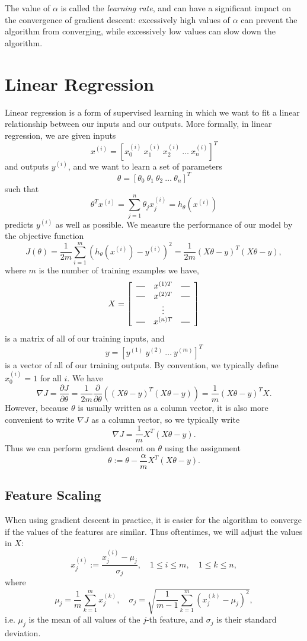 \documentclass{article}
\newcommand*{\horzbar}{\rule[.5ex]{2.5ex}{0.5pt}}
\begin{document}
The value of $\alpha$ is called the \emph{learning rate}, and can have a significant impact on the convergence of gradient descent: excessively high values of $\alpha$ can prevent the algorithm from converging, while excessively low values can slow down the algorithm.

\section{Linear Regression}\label{linreg}
Linear regression is a form of supervised learning in which we want to fit a linear relationship between our inputs and our outputs. More formally, in linear regression, we are given inputs 
$$x^{(i)} = \left[x_0^{(i)}\ x_1^{(i)}\ x_2^{(i)}\ \dots \ x_n^{(i)}\right]^T$$
and outputs $y^{(i)}$, and we want to learn a set of parameters
$$\theta = \left[\theta_0\ \theta_1\ \theta_2\ \dots \ \theta_n\right]^T$$
such that
$$\theta^T x^{(i)} = \sum_{j=1}^n \theta_j x_j^{(i)} = h_{\theta}\left(x^{(i)}\right)$$
predicts $y^{(i)}$ as well as possible. We measure the performance of our model by the objective function
$$J(\theta) = \frac{1}{2m}\sum_{i=1}^m \left(h_{\theta}\left(x^{(i)}\right) - y^{(i)}\right)^2 = \frac{1}{2m}(X\theta - y)^T(X\theta-y),$$
where $m$ is the number of training examples we have, 
$$X = \left[
\begin{array}{ccc}
\horzbar & x^{(1)T} & \horzbar \\
\horzbar & x^{(2)T} & \horzbar \\
& \vdots & \\
\horzbar & x^{(n)T} & \horzbar \\
\end{array}
\right]$$
is a matrix of all of our training inputs, and
$$y = \left[y^{(1)}\ y^{(2)}\ \dots \ y^{(m)}\right]^T$$
is a vector of all of our training outputs. By convention, we typically define $x_0^{(i)} = 1$ for all $i$. We have
$$\nabla J = \frac{\partial J}{\partial \theta} = \frac{1}{2m} \frac{\partial}{\partial \theta}\left((X\theta - y)^T(X\theta - y)\right) = \frac{1}{m}(X\theta - y)^T X.$$
However, because $\theta$ is usually written as a column vector, it is also more convenient to write $\nabla J$ as a column vector, so we typically write
$$\nabla J = \frac{1}{m} X^T(X\theta - y).$$
Thus we can perform gradient descent on $\theta$ using the assignment
$$\theta := \theta - \frac{\alpha}{m} X^T(X\theta - y).$$
\subsection{Feature Scaling}
When using gradient descent in practice, it is easier for the algorithm to converge if the values of the features are similar. Thus oftentimes, we will adjust the values in $X$:
$$x_j^{(i)} := \frac{x_j^{(i)} - \mu_j}{\sigma_j},\quad 1 \le i \le m, \quad 1 \le k \le n,$$
where
$$\mu_j = \frac{1}{m}\sum_{k=1}^{m}x^{(k)}_j, \quad \sigma_j = \sqrt{\frac{1}{m-1}\sum_{k=1}^m (x^{(k)}_j - \mu_j)^2},$$
i.e. $\mu_j$ is the mean of all values of the $j$-th feature, and $\sigma_j$ is their standard deviation.
\end{document}

